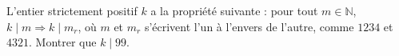 L'entier strictement positif $k$ a la propriété suivante : pour tout $m \in \mathbb{N}$, $k \mid m \Rightarrow k \mid m_r$, où $m$ et $m_r$ s'écrivent l'un à l'envers de l'autre, comme $1234$ et $4321$. Montrer que $k \mid 99$.
